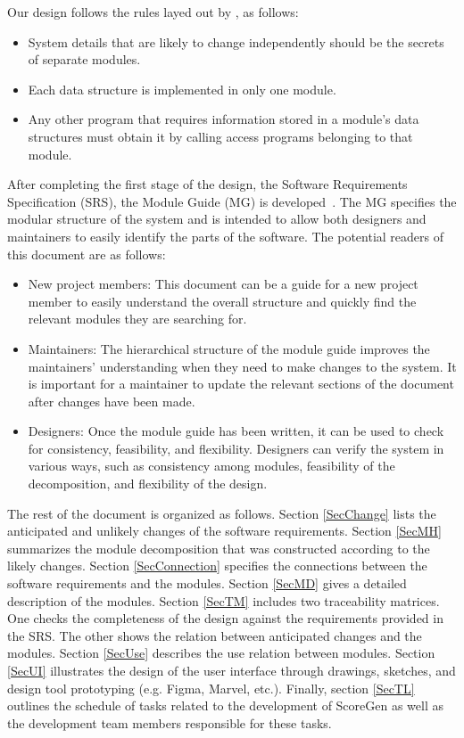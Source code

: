 \documentclass[12pt, titlepage]{article}
\begin{document}
Our design follows the rules layed out by \citet{ParnasEtAl1984}, as follows:
\begin{itemize}
\item System details that are likely to change independently should be the
  secrets of separate modules.
\item Each data structure is implemented in only one module.
\item Any other program that requires information stored in a module's data
  structures must obtain it by calling access programs belonging to that module.
\end{itemize}

After completing the first stage of the design, the Software Requirements
Specification (SRS), the Module Guide (MG) is developed~\citep{ParnasEtAl1984}. The MG
specifies the modular structure of the system and is intended to allow both
designers and maintainers to easily identify the parts of the software.  The
potential readers of this document are as follows:

\begin{itemize}
\item New project members: This document can be a guide for a new project member
  to easily understand the overall structure and quickly find the
  relevant modules they are searching for.
\item Maintainers: The hierarchical structure of the module guide improves the
  maintainers' understanding when they need to make changes to the system. It is
  important for a maintainer to update the relevant sections of the document
  after changes have been made.
\item Designers: Once the module guide has been written, it can be used to
  check for consistency, feasibility, and flexibility. Designers can verify the
  system in various ways, such as consistency among modules, feasibility of the
  decomposition, and flexibility of the design.
\end{itemize}

The rest of the document is organized as follows. Section
\ref{SecChange} lists the anticipated and unlikely changes of the software
requirements. Section \ref{SecMH} summarizes the module decomposition that
was constructed according to the likely changes. Section \ref{SecConnection}
specifies the connections between the software requirements and the
modules. Section \ref{SecMD} gives a detailed description of the
modules. Section \ref{SecTM} includes two traceability matrices. One checks
the completeness of the design against the requirements provided in the SRS. The
other shows the relation between anticipated changes and the modules. Section
\ref{SecUse} describes the use relation between modules. Section \ref{SecUI} illustrates the design 
of the user interface through drawings, sketches, and design tool prototyping 
(e.g. Figma, Marvel, etc.). Finally, section \ref{SecTL} outlines the schedule 
of tasks related to the development of ScoreGen as well as the development team 
members responsible for these tasks.
\end{document}
